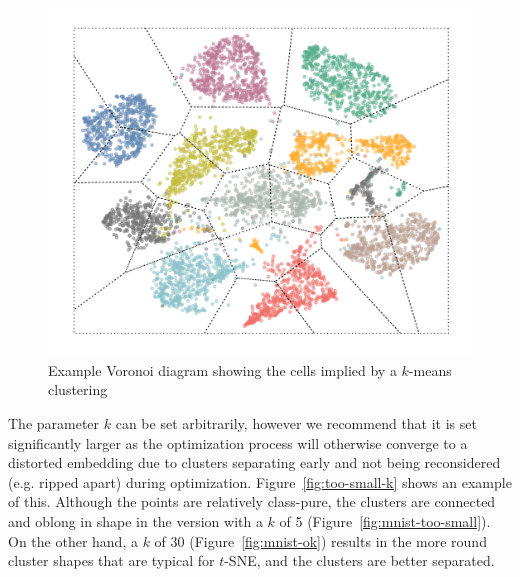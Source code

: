 \begin{figure}[!tbp]
  \centering
  \includegraphics[width=0.7\linewidth]{img/voronoi_optdigits}
  \caption{Example Voronoi diagram showing the cells implied by a $k$-means clustering}
  \label{fig:voronoi-optdigits}
\end{figure}

The parameter $k$ can be set arbitrarily, however we recommend that it is set
significantly larger as the optimization process will otherwise converge to
a distorted embedding due to clusters separating early and not being reconsidered (e.g. ripped apart)
during optimization. Figure~\ref{fig:too-small-k} shows an example of this. Although
the points are relatively class-pure, the clusters are connected and oblong in shape
in the version with a $k$ of 5 (Figure~\ref{fig:mnist-too-small}). On the other hand,
a $k$ of 30 (Figure~\ref{fig:mnist-ok}) results in the more round cluster shapes that are typical for $t$-SNE, and
the clusters are better separated.

\vfill

